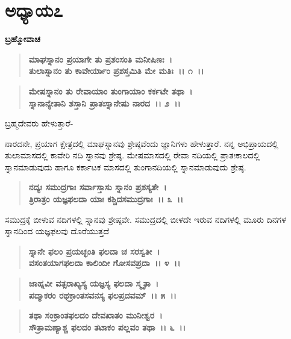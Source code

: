 \newpage

\section*{ಅಧ್ಯಾಯ\enginline{-}೭}

\begin{flushleft}
\textbf{ಬ್ರಹ್ಮೋವಾಚ\enginline{-} }
\end{flushleft}

\begin{verse}
\textbf{ಮಾಘಸ್ನಾನಂ ಪ್ರಯಾಗೇ ತು ಪ್ರಶಂಸಂತಿ ಮನೀಷಿಣಃ~।}\\\textbf{ತುಲಾಸ್ನಾನಂ ತು ಕಾವೇರ್ಯಾಂ ಪ್ರಶಸ್ತಮಿತಿ ಮೇ ಮತಿಃ~।। ೧~।। }
\end{verse}

\begin{verse}
\textbf{ಮೇಷಸ್ನಾನಂ ತು ರೇವಾಯಾಂ ತುಂಗಾಯಾಂ ಕರ್ಕಟೇ ತಥಾ~।}\\\textbf{ಸ್ನಾನಾನ್ಯೇತಾನಿ ಶಸ್ತಾನಿ ಪ್ರಾತಃಸ್ನಾನೇಷು ನಾರದ~।। ೨~।।}
\end{verse}

\begin{flushleft}
 ಬ್ರಹ್ಮದೇವರು ಹೇಳುತ್ತಾರೆ- 
\end{flushleft}

ನಾರದನೇ, ಪ್ರಯಾಗ ಕ್ಷೇತ್ರದಲ್ಲಿ ಮಾಘಸ್ನಾನವು ಶ್ರೇಷ್ಠವೆಂದು ಜ್ಞಾನಿಗಳು ಹೇಳುತ್ತಾರೆ. ನನ್ನ ಅಭಿಪ್ರಾಯದಲ್ಲಿ ತುಲಾಮಾಸದಲ್ಲಿ ಕಾವೇರಿ ನದಿ ಸ್ನಾನವು ಶ್ರೇಷ್ಠ. ಮೇಷಮಾಸದಲ್ಲಿ ರೇವಾ ನದಿಯಲ್ಲಿ ಪ್ರಾತಃಕಾಲದಲ್ಲಿ ಸ್ನಾನಮಾಡುವುದು ಹಾಗೂ ಕರ್ಕಾಟಕ ಮಾಸದಲ್ಲಿ ತುಂಗಾನದಿಯಲ್ಲಿ ಸ್ನಾನಮಾಡುವುದು ಶ್ರೇಷ್ಠ.

\begin{verse}
\textbf{ನದ್ಯಃ ಸಮುದ್ರಗಾಃ ಸರ್ವಾಸ್ತಾಸು ಸ್ನಾನಂ ಪ್ರಶಸ್ಯತೇ~।}\\\textbf{ತ್ರಿರಾತ್ರಂ ಯಜ್ಞಫಲದಾ ಯಾಃ ಕಶ್ಚಿದಸಮುದ್ರಗಾಃ~।। ೩~।। }
\end{verse}

ಸಮುದ್ರಕ್ಕೆ ಬೀಳುವ ನದಿಗಳಲ್ಲಿ ಸ್ನಾನವು ಶ್ರೇಷ್ಠವೇ. ಸಮುದ್ರದಲ್ಲಿ ಬೀಳದೇ ಇರುವ ನದಿಗಳಲ್ಲಿ ಮೂರು ದಿನಗಳ ಸ್ನಾನದಿಂದ ಯಜ್ಞಫಲವು ದೊರೆಯುತ್ತದೆ

\begin{verse}
\textbf{ಸ್ನಾನೇ ಫಲಂ ಪ್ರಯಚ್ಛಂತಿ ಫಲದಾ ಚ ಸರಸ್ವತೀ~।}\\\textbf{ವಸಂತಯಾಗಫಲದಾ ಕಾಲಿಂದೀ ಗೋಸವಪ್ರದಾ~।। ೪~।।} 
\end{verse}

\begin{verse}
\textbf{ಜಾಹ್ನವೀ ವತ್ಸರಾಖ್ಯಸ್ಯ ಯಜ್ಞಸ್ಯ ಫಲದಾ ಸ್ಮೃತಾ~।}\\\textbf{ಪದ್ಮಾಕರಂ ರಥಕ್ರಾಂತಸವನಸ್ಯ ಫಲಪ್ರದವಮ್~।। ೫~।।} 
\end{verse}

\begin{verse}
\textbf{ತಥಾ ಸಂಕ್ರಾಂತಫಲದಂ ದೇವಖಾತಂ ಮುನೀಶ್ವರ~।}\\\textbf{ಸೌತ್ರಾಮಣ್ಯಾಶ್ಚ ಫಲದಂ ತಟಾಕಂ ಪಲ್ಲವಂ ತಥಾ~।। ೬~।।} 
\end{verse}

